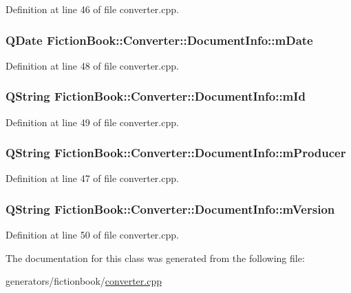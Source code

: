 Definition at line 46 of file converter.\+cpp.

\hypertarget{classConverter_1_1DocumentInfo_a5a6937c62c571c7c757aa753012a24ca}{
\subsubsection[{m\+Date}]{\setlength{\rightskip}{0pt plus 5cm}Q\+Date Fiction\+Book\+::\+Converter\+::\+Document\+Info\+::m\+Date}}\label{classConverter_1_1DocumentInfo_a5a6937c62c571c7c757aa753012a24ca}


Definition at line 48 of file converter.\+cpp.

\hypertarget{classConverter_1_1DocumentInfo_a38f83204dec0ae6800d51ebdaafcb030}{
\subsubsection[{m\+Id}]{\setlength{\rightskip}{0pt plus 5cm}Q\+String Fiction\+Book\+::\+Converter\+::\+Document\+Info\+::m\+Id}}\label{classConverter_1_1DocumentInfo_a38f83204dec0ae6800d51ebdaafcb030}


Definition at line 49 of file converter.\+cpp.

\hypertarget{classConverter_1_1DocumentInfo_a37486c959f5eb91b039b54092aa4eb33}{
\subsubsection[{m\+Producer}]{\setlength{\rightskip}{0pt plus 5cm}Q\+String Fiction\+Book\+::\+Converter\+::\+Document\+Info\+::m\+Producer}}\label{classConverter_1_1DocumentInfo_a37486c959f5eb91b039b54092aa4eb33}


Definition at line 47 of file converter.\+cpp.

\hypertarget{classConverter_1_1DocumentInfo_ac06f33613cdbcec3be7fe4d70c8a9e51}{
\subsubsection[{m\+Version}]{\setlength{\rightskip}{0pt plus 5cm}Q\+String Fiction\+Book\+::\+Converter\+::\+Document\+Info\+::m\+Version}}\label{classConverter_1_1DocumentInfo_ac06f33613cdbcec3be7fe4d70c8a9e51}


Definition at line 50 of file converter.\+cpp.



The documentation for this class was generated from the following file\+:\begin{DoxyCompactItemize}
\item 
generators/fictionbook/\hyperlink{fictionbook_2converter_8cpp}{converter.\+cpp}\end{DoxyCompactItemize}
